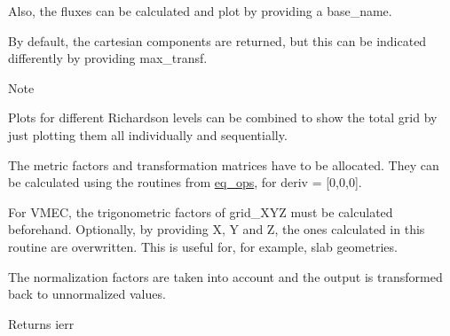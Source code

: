 Also, the fluxes can be calculated and plot by providing a {\ttfamily base\+\_\+name}.

By default, the cartesian components are returned, but this can be indicated differently by providing {\ttfamily max\+\_\+transf}.

\begin{DoxyNote}{Note}

\begin{DoxyEnumerate}
\item Plots for different Richardson levels can be combined to show the total grid by just plotting them all individually and sequentially.
\item The metric factors and transformation matrices have to be allocated. They can be calculated using the routines from \hyperlink{namespaceeq__ops}{eq\+\_\+ops}, for {\ttfamily deriv = \mbox{[}0,0,0\mbox{]}}.
\item For V\+M\+EC, the trigonometric factors of {\ttfamily grid\+\_\+\+X\+YZ} must be calculated beforehand. Optionally, by providing {\ttfamily X}, {\ttfamily Y} and {\ttfamily Z}, the ones calculated in this routine are overwritten. This is useful for, for example, slab geometries.
\item The normalization factors are taken into account and the output is transformed back to unnormalized values.
\end{DoxyEnumerate}
\end{DoxyNote}
\begin{DoxyReturn}{Returns}
ierr
\end{DoxyReturn}

